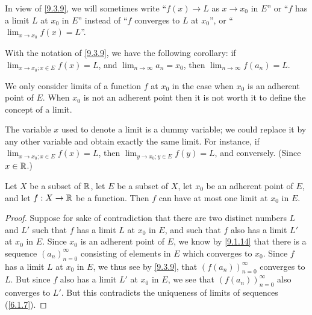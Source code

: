 \begin{note}
  In view of \cref{9.3.9}, we will sometimes write ``\(f(x) \to L\) as \(x \to x_0\) in \(E\)'' or ``\(f\) has a limit \(L\) at \(x_0\) in \(E\)'' instead of ``\(f\) converges to \(L\) at \(x_0\)'', or ``\(\lim_{x \to x_0} f(x) = L\)''.
\end{note}

\begin{rmk}\label{9.3.10}
  With the notation of \cref{9.3.9}, we have the following corollary:
  if \(\lim_{x \to x_0 ; x \in E} f(x) = L\), and \(\lim_{n \to \infty} a_n = x_0\), then \(\lim_{n \to \infty} f(a_n) = L\).
\end{rmk}

\begin{rmk}\label{9.3.11}
  We only consider limits of a function \(f\) at \(x_0\) in the case when \(x_0\) is an adherent point of \(E\).
  When \(x_0\) is not an adherent point then it is not worth it to define the concept of a limit.
\end{rmk}

\begin{rmk}\label{9.3.12}
  The variable \(x\) used to denote a limit is a dummy variable;
  we could replace it by any other variable and obtain exactly the same limit.
  For instance, if \(\lim_{x \to x_0 ; x \in E} f(x) = L\), then \(\lim_{y \to x_0 ; y \in E} f(y) = L\), and conversely.
  (Since \(x \in \mathbb{R}\).)
\end{rmk}

\begin{cor}\label{9.3.13}
  Let \(X\) be a subset of \(\mathbb{R}\), let \(E\) be a subset of \(X\), let \(x_0\) be an adherent point of \(E\), and let \(f : X \to \mathbb{R}\) be a function.
  Then \(f\) can have at most one limit at \(x_0\) in \(E\).
\end{cor}

\begin{proof}
  Suppose for sake of contradiction that there are two distinct numbers \(L\) and \(L'\) such that \(f\) has a limit \(L\) at \(x_0\) in \(E\), and such that \(f\) also has a limit \(L'\) at \(x_0\) in \(E\).
  Since \(x_0\) is an adherent point of \(E\), we know by \cref{9.1.14} that there is a sequence \((a_n)_{n = 0}^\infty\) consisting of elements in \(E\) which converges to \(x_0\).
  Since \(f\) has a limit \(L\) at \(x_0\) in \(E\), we thus see by \cref{9.3.9}, that \((f(a_n))_{n = 0}^\infty\) converges to \(L\).
  But since \(f\) also has a limit \(L'\) at \(x_0\) in \(E\), we see that \((f(a_n))_{n = 0}^\infty\) also converges to \(L'\).
  But this contradicts the uniqueness of limits of sequences (\cref{6.1.7}).
\end{proof}

